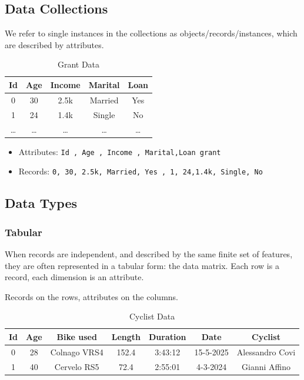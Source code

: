 \subsection{Data Collections}
We refer to single instances in the collections as objects/records/instances, which are
described by attributes.

\begin{table}[h!]
\centering
\begin{tabular}{ccccc}
\toprule
\textbf{Id} & \textbf{Age} & \textbf{Income} & \textbf{Marital} & \textbf{Loan} \\
\midrule
0 & 30 & 2.5k & Married & Yes \\
1 & 24 & 1.4k & Single  & No  \\
\ldots & \ldots & \ldots & \ldots & \ldots \\
\bottomrule
\end{tabular}
\caption{Grant Data}
\end{table}

\begin{itemize}
	\item Attributes: \lstinline|Id , Age , Income , Marital,Loan grant|
	\item Records: \lstinline|0, 30, 2.5k, Married, Yes , 1, 24,1.4k, Single, No|
\end{itemize}

\subsection{Data Types}
\subsubsection{Tabular}
When records are independent, and described by the same finite set of features, they
are often represented in a tabular form: the data matrix. Each row is a record, each
dimension is an attribute.


Records on the rows, attributes on the columns.

\begin{table}[h!]
\centering
\begin{tabular}{ccccccc}
\toprule
\textbf{Id} & \textbf{Age} & \textbf{Bike used} & \textbf{Length} & \textbf{Duration} & \textbf{Date} & \textbf{Cyclist} \\
\midrule
0 & 28 & Colnago VRS4 & 152.4 & 3:43:12 & 15-5-2025 & Alessandro Covi \\
1 & 40 & Cervelo RS5  & 72.4  & 2:55:01 & 4-3-2024  & Gianni Affino  \\
\bottomrule
\end{tabular}
\caption{Cyclist Data}
\end{table}

